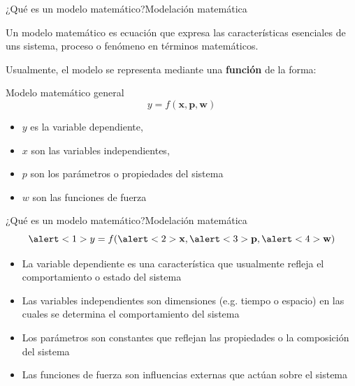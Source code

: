 \documentclass[spanish, c]{beamer}
\begin{document}
\begin{frame}{¿Qué es un modelo matemático?}{Modelación matemática}

    Un modelo matemático es \alert{ecuación} que expresa las características esenciales de uns sistema, proceso o fenómeno en términos matemáticos. \pause

    Usualmente, el modelo se representa mediante una \textbf{función} de la forma:

    \begin{block}{Modelo matemático general}
        $$y = f(\mathbf{x}, \mathbf{p}, \mathbf{w})$$

        \begin{itemize}
            \item $y$ es la variable dependiente,
            \item $x$ son las variables independientes,
            \item $p$ son los parámetros o propiedades del sistema
            \item $w$ son las funciones de fuerza
        \end{itemize}
    \end{block} \pause

\end{frame}

\begin{frame}{¿Qué es un modelo matemático?}{Modelación matemática}
    $$\alert<1>{y} = f(\alert<2>{\mathbf{x}}, \alert<3>{\mathbf{p}}, \alert<4>{\mathbf{w}})$$

    \bigskip

    \begin{itemize}[<+->]
        \item La \alert<1>{variable dependiente} es una característica que usualmente refleja el comportamiento o estado del sistema
        \item Las \alert<2>{variables independientes} son dimensiones (e.g. tiempo o espacio) en las cuales se determina el comportamiento del sistema
        \item Los \alert<3>{parámetros} son constantes que reflejan las propiedades o la composición del sistema
        \item Las \alert<4>{funciones de fuerza} son influencias externas que actúan sobre el sistema
    \end{itemize}

\end{frame}
\end{document}
